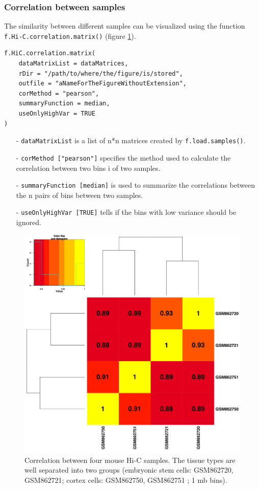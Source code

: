\documentclass[a4paper,10pt]{article}
\begin{document}
\clearpage
\subsubsection{Correlation between samples}
The similarity between different samples can be visualized using the function \texttt{f.Hi-C.correlation.matrix()} (figure \ref{sampleCorMat}).
\begin{verbatim}
f.HiC.correlation.matrix(
    dataMatrixList = dataMatrices,
    rDir = "/path/to/where/the/figure/is/stored",
    outfile = "aNameForTheFigureWithoutExtension",
    corMethod = "pearson",
    summaryFunction = median,
    useOnlyHighVar = TRUE
)
\end{verbatim}
\begin{itemize}
 \item[-] \texttt{dataMatrixList} is a list of n*n matrices created by \texttt{f.load.samples()}. 
 \item[-] \texttt{corMethod ["pearson"]} specifies the method used to calculate the correlation between two bins i of two samples.
 \item[-] \texttt{summaryFunction [median]} is used to summarize the correlations between the n pairs of bins between two samples.
 \item[-] \texttt{useOnlyHighVar [TRUE]} tells if the bins with low variance should be ignored.
\end{itemize}
\clearpage
\begin{figure}[!ht]
\begin{center}
\centering
\includegraphics[width=5in]{Mm_cor_mat.png}
\end{center}
\caption{Correlation between four mouse Hi-C samples. The tissue types are well separated into two groups (embryonic stem cells: GSM862720, GSM862721; cortex cells: GSM862750, GSM862751 \cite{2012_Dixon}; 1 mb bins).}
\label{sampleCorMat}
\end{figure}
\end{document}
